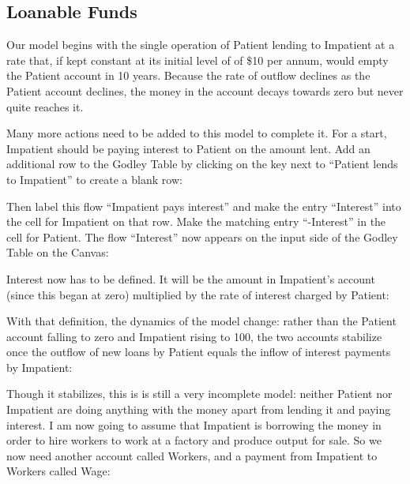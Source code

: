 \subsection{Loanable Funds}

Our model begins with the single operation of Patient lending to
Impatient at a rate that, if kept constant at its initial level of of
\$10 per annum, would empty the Patient account in 10 years. Because
the rate of outflow declines as the Patient account declines, the
money in the account decays towards zero but never quite reaches it.


Many more actions need to be added to this model to complete it. For a
start, Impatient should be paying interest to Patient on the amount
lent. Add an additional row to the Godley Table by clicking on the
 key
next to ``Patient lends to Impatient'' to create a blank row:


Then label this flow ``Impatient pays interest'' and make the entry
``Interest'' into the cell for Impatient on that row. Make the matching
entry ``-Interest'' in the cell for Patient. The flow ``Interest'' now
appears on the input side of the Godley Table on the Canvas: 


Interest now has to be defined. It will be the amount in Impatient's
account (since this began at zero) multiplied by the rate of interest
charged by Patient:



With that definition, the dynamics of the model change: rather than
the Patient account falling to zero and Impatient rising to 100, the
two accounts stabilize once the outflow of new loans by Patient equals
the inflow of interest payments by Impatient:



Though it stabilizes, this is is still a very incomplete model:
neither Patient nor Impatient are doing anything with the money apart
from lending it and paying interest. I am now going to assume that
Impatient is borrowing the money in order to hire workers to work at a
factory and produce output for sale. So we now need another account
called Workers, and a payment from Impatient to Workers called Wage:




